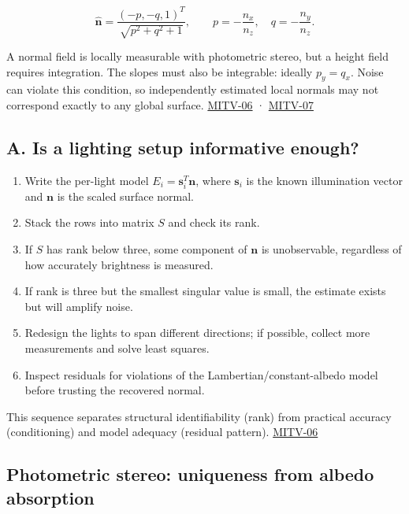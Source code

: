 \[
\hat{\mathbf{n}}=\frac{(-p,-q,1)^T}{\sqrt{p^2+q^2+1}},\qquad p=-\frac{n_x}{n_z},\quad q=-\frac{n_y}{n_z}.
\]

A normal field is locally measurable with photometric stereo, but a height field requires integration. The slopes must also be integrable: ideally \(p_y=q_x\). Noise can violate this condition, so independently estimated local normals may not correspond exactly to any global surface. \hyperref[04-visual-computing-ii-ch036-mitv-06---photometric-stereo-noise-gain-error-amplification-eigenvalues-and-eigenvectors-review]{MITV-06} · \hyperref[04-visual-computing-ii-ch036-mitv-07---gradient-space-reflectance-map-image-irradiance-equation-gnomonic-projection]{MITV-07}

\subsection{A. Is a lighting setup informative enough?}\label{04-visual-computing-ii-ch032-a.-is-a-lighting-setup-informative-enough}

\begin{enumerate}
\def\labelenumi{\arabic{enumi}.}
\tightlist
\item
  Write the per-light model \(E_i=\mathbf{s}_i^T\mathbf{n}\), where \(\mathbf{s}_i\) is the known illumination vector and \(\mathbf{n}\) is the scaled surface normal.
\item
  Stack the rows into matrix \(S\) and check its rank.
\item
  If \(S\) has rank below three, some component of \(\mathbf{n}\) is unobservable, regardless of how accurately brightness is measured.
\item
  If rank is three but the smallest singular value is small, the estimate exists but will amplify noise.
\item
  Redesign the lights to span different directions; if possible, collect more measurements and solve least squares.
\item
  Inspect residuals for violations of the Lambertian/constant-albedo model before trusting the recovered normal.
\end{enumerate}

This sequence separates structural identifiability (rank) from practical accuracy (conditioning) and model adequacy (residual pattern). \hyperref[04-visual-computing-ii-ch036-mitv-06---photometric-stereo-noise-gain-error-amplification-eigenvalues-and-eigenvectors-review]{MITV-06}

\subsection{Photometric stereo: uniqueness from albedo absorption}\label{04-visual-computing-ii-ch032-photometric-stereo-uniqueness-from-albedo-absorption}

